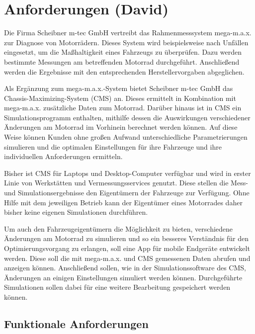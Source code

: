 \chapter{Anforderungen (David)}
\label{chap:anf}
	
	Die Firma Scheibner m-tec GmbH vertreibt das Rahmenmesssystem mega-m.a.x. zur Diagnose von Motorrädern. Dieses System wird beispielsweise nach Unfällen eingesetzt, um die Maßhaltigkeit eines Fahrzeugs zu überprüfen. Dazu werden bestimmte Messungen am betreffenden Motorrad durchgeführt. Anschließend werden die Ergebnisse mit den entsprechenden Herstellervorgaben abgeglichen.
	
	Als Ergänzung zum mega-m.a.x.-System bietet Scheibner m-tec GmbH das Chassis-Maximizing-System (CMS) an. Dieses ermittelt in Kombination mit mega-m.a.x. zusätzliche Daten zum Motorrad. Darüber hinaus ist in CMS ein Simulationsprogramm enthalten, mithilfe dessen die Auswirkungen verschiedener Änderungen am Motorrad im Vorhinein berechnet werden können. Auf diese Weise können Kunden ohne großen Aufwand unterschiedliche Parametrierungen simulieren und die optimalen Einstellungen für ihre Fahrzeuge und ihre individuellen Anforderungen ermitteln.
	
	Bisher ist CMS für Laptops und Desktop-Computer verfügbar und wird in erster Linie von Werkstätten und Vermessungsservices genutzt. Diese stellen die Mess- und Simulationsergebnisse den Eigentümern der Fahrzeuge zur Verfügung. Ohne Hilfe mit dem jeweiligen Betrieb kann der Eigentümer eines Motorrades daher bisher keine eigenen Simulationen durchführen.
	
	Um auch den Fahrzeugeigentümern die Möglichkeit zu bieten, verschiedene Änderungen am Motorrad zu simulieren und so ein besseres Verständnis für den Optimierungsvorgang zu erlangen, soll eine App für mobile Endgeräte entwickelt werden. Diese soll die mit mega-m.a.x. und CMS gemessenen Daten abrufen und anzeigen können. Anschließend sollen, wie in der Simulationssoftware des CMS, Änderungen an einigen Einstellungen simuliert werden können. Durchgeführte Simulationen sollen dabei für eine weitere Bearbeitung gespeichert werden können.

	\section{Funktionale Anforderungen}
	\label{sec:funktionale-anf}
	
